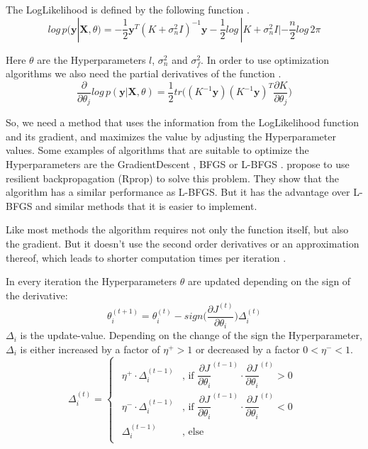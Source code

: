 The \gls{LogLikelihood} is defined by the following function \citep[p.\ 113]{Rasmussen:2005:GPM:1162254}.
\begin{equation} \label{eq:ll}
log\,p(\mathbf{y}|\mathbf{X},\theta) = -\dfrac{1}{2}\mathbf{y}^T(K+\sigma^2_nI)^{-1}\mathbf{y}-\dfrac{1}{2}log\,|K+\sigma^2_nI|-\dfrac{n}{2}log\,2\pi
\end{equation}

Here $\theta$ are the \gls{Hyperparameter}s $l$, $\sigma_n^2$ and $\sigma_f^2$. In order to use optimization algorithms we also need the partial derivatives of the function \citep[p.\ 114]{Rasmussen:2005:GPM:1162254}.
\begin{equation}\label{eq:lld}
\dfrac{\partial}{\partial\theta_j}log\,p(\mathbf{y}|\mathbf{X},\theta) = \dfrac{1}{2}tr\bigg((K^{-1}\mathbf{y}) (K^{-1}\mathbf{y})^T \dfrac{\partial K}{\partial \theta_j}\bigg)
\end{equation}

So, we need a method that uses the information from the \gls{LogLikelihood} function and its gradient, and maximizes the value by adjusting the \gls{Hyperparameter} values. 
Some examples of algorithms that are suitable to optimize the \gls{Hyperparameter}s are the \gls{GradientDescent} \citep{Shewchuk:1994:ICG:865018}, \Gls{BFGS} or \Gls{L-BFGS} \citep{liu1989limited}. \citet{blum2013optimization} propose to use resilient backpropagation (\Gls{Rprop}) to solve this problem. They show that the algorithm has a similar performance as \Gls{L-BFGS}. But it has the advantage over \Gls{L-BFGS} and similar methods that it is easier to implement.

Like most methods the algorithm requires not only the function itself, but also the gradient. But it doesn't use the second order derivatives or an approximation thereof, which leads to shorter computation times per iteration \citep{blum2013optimization}. 

In every iteration the \gls{Hyperparameter}s $\theta$ are updated depending on the sign of the derivative:
\begin{equation}
\theta_i^{(t+1)} = \theta_i^{(t)} - sign\bigg(\dfrac{\partial J^{(t)}}{\partial \theta_i}\bigg) \Delta_i^{(t)}
\end{equation}
$\Delta_i$ is the update-value. Depending on the change of the sign the \gls{Hyperparameter}, $\Delta_i$ is either increased by a factor of $\eta^+ > 1$ or decreased by a factor $0 < \eta^- < 1$. 
\begin{equation}
\Delta_i^{(t)} = 
\begin{cases}
\begin{aligned}
\eta^+\cdot\Delta_i^{(t-1)} &\text{, if } \dfrac{\partial J}{\partial \theta_i}^{(t-1)}\cdot\dfrac{\partial J}{\partial \theta_i}^{(t)} > 0 \\
\eta^-\cdot\Delta_i^{(t-1)} &\text{, if } \dfrac{\partial J}{\partial \theta_i}^{(t-1)}\cdot\dfrac{\partial J}{\partial \theta_i}^{(t)} < 0\\
\Delta_i^{(t-1)} &\text{, else}
\end{aligned}
\end{cases}
\end{equation}

